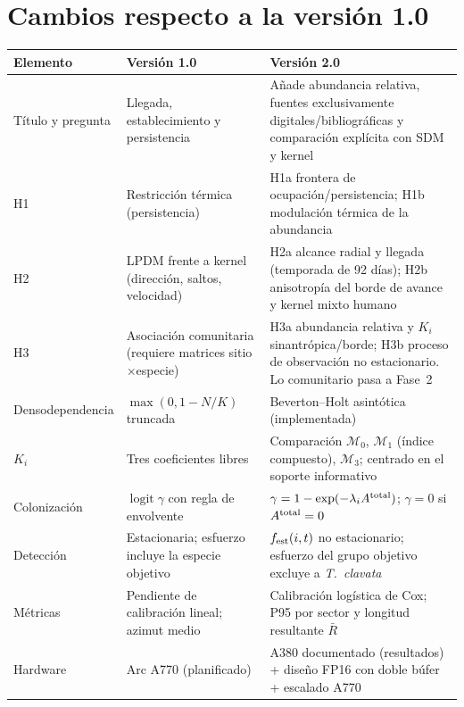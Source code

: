 \documentclass[11pt,letterpaper]{article}
\newcommand{\logit}{\operatorname{logit}}
\begin{document}
\section{Cambios respecto a la versión 1.0}
\begin{center}\small
\begin{tabularx}{\textwidth}{@{}p{3.0cm}YY@{}}\toprule
Elemento & Versión 1.0 & Versión 2.0 \\\midrule
Título y pregunta & Llegada, establecimiento y persistencia & Añade abundancia relativa, fuentes exclusivamente digitales/bibliográficas y comparación explícita con SDM y kernel \\
H1 & Restricción térmica (persistencia) & H1a frontera de ocupación/persistencia; H1b modulación térmica de la abundancia \\
H2 & LPDM frente a kernel (dirección, saltos, velocidad) & H2a alcance radial y llegada (temporada de 92 días); H2b anisotropía del borde de avance y kernel mixto humano \\
H3 & Asociación comunitaria (requiere matrices sitio$\times$especie) & H3a abundancia relativa y $K_i$ sinantrópica/borde; H3b proceso de observación no estacionario. Lo comunitario pasa a Fase~2 \\
Densodependencia & $\max(0,1-N/K)$ truncada & Beverton--Holt asintótica (implementada) \\
$K_i$ & Tres coeficientes libres & Comparación $\mathcal M_0$, $\mathcal M_1$ (índice compuesto), $\mathcal M_3$; centrado en el soporte informativo \\
Colonización & $\logit\gamma$ con regla de envolvente & $\gamma=1-\exp(-\lambda_iA^{\rm total})$; $\gamma=0$ si $A^{\rm total}=0$ \\
Detección & Estacionaria; esfuerzo incluye la especie objetivo & $f_{\rm est}(i,t)$ no estacionario; esfuerzo del grupo objetivo excluye a \textit{T.~clavata} \\
Métricas & Pendiente de calibración lineal; azimut medio & Calibración logística de Cox; P95 por sector y longitud resultante $\bar R$ \\
Hardware & Arc A770 (planificado) & A380 documentado (resultados) + diseño FP16 con doble búfer + escalado A770 \\
\bottomrule\end{tabularx}\end{center}

\end{document}
